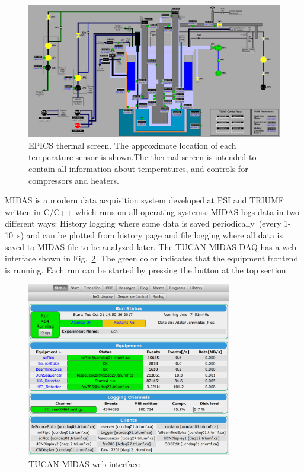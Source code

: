\begin{figure}[h!]
  \centering
  \includegraphics[width=1.0\textwidth]{epics.png}
  \caption{EPICS thermal screen. The approximate location of each
    temperature sensor is shown.The thermal screen is intended to
    contain all information about temperatures, and controls for
    compressors and heaters. }
  \label{fig:epics}
\end{figure}

MIDAS is a modern data acquisition system developed at PSI and TRIUMF
written in C/C++ which runs on all operating systems. MIDAS logs data
in two different ways: History logging where some data is saved
periodically~(every 1-10~s) and can be plotted from history page and
file logging where all data is saved to MIDAS file to be analyzed
later. The TUCAN MIDAS DAQ has a web interface shown in
Fig.~\ref{fig:midas}. The green color indicates that the equipment
frontend is running. Each run can be started by pressing the button at
the top section.

\begin{figure}[h!]
  \centering
  \includegraphics[width=0.8\textwidth]{midas.png}
  \caption{TUCAN MIDAS web interface }
  \label{fig:midas}
\end{figure}

